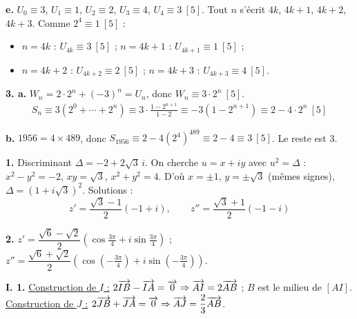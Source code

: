 \documentclass[11pt]{article}
\begin{document}
\textbf{e.} $U_0 \equiv 3$, $U_1 \equiv 1$, $U_2 \equiv 2$, $U_3 \equiv 4$, $U_4 \equiv 3\ [5]$. Tout $n$ s'écrit $4k$, $4k+1$, $4k+2$, $4k+3$. Comme $2^4 \equiv 1\ [5]$ :
\begin{itemize}
  \item $n = 4k$ : $U_{4k} \equiv 3\ [5]$ ; \quad $n = 4k+1$ : $U_{4k+1} \equiv 1\ [5]$ ;
  \item $n = 4k+2$ : $U_{4k+2} \equiv 2\ [5]$ ; \quad $n = 4k+3$ : $U_{4k+3} \equiv 4\ [5]$.
\end{itemize}

\textbf{3. a.} $W_n = 2\cdot 2^n + (-3)^n = U_n$, donc $W_n \equiv 3\cdot 2^n\ [5]$.
\begin{align*}
S_n \equiv 3(2^0 + \cdots + 2^n) \equiv 3\cdot\frac{1 - 2^{n+1}}{1 - 2} \equiv -3(1 - 2^{n+1}) \equiv 2 - 4\cdot 2^n\ [5]
\end{align*}

\textbf{b.} $1956 = 4\times489$, donc $S_{1956} \equiv 2 - 4(2^4)^{489} \equiv 2 - 4 \equiv 3\ [5]$. Le reste est 3.


\textbf{1.} Discriminant $\Delta = -2 + 2\sqrt{3}\,i$. On cherche $u = x + iy$ avec $u^2 = \Delta$ : $x^2 - y^2 = -2$, $xy = \sqrt{3}$, $x^2 + y^2 = 4$. D'où $x = \pm1$, $y = \pm\sqrt{3}$ (mêmes signes), $\Delta = (1 + i\sqrt{3})^2$. Solutions :
\[ z' = \frac{\sqrt{3} - 1}{2}(-1 + i), \qquad z'' = \frac{\sqrt{3} + 1}{2}(-1 - i) \]

\textbf{2.} $z' = \dfrac{\sqrt{6} - \sqrt{2}}{2}\left(\cos\tfrac{3\pi}{4} + i\sin\tfrac{3\pi}{4}\right)$ ; \quad $z'' = \dfrac{\sqrt{6} + \sqrt{2}}{2}\left(\cos\left(-\tfrac{3\pi}{4}\right) + i\sin\left(-\tfrac{3\pi}{4}\right)\right)$.

\prob{}

\textbf{I. 1.} \underline{Construction de $I$ :} $2\overrightarrow{IB} - \overrightarrow{IA} = \overrightarrow{0} \Rightarrow \overrightarrow{AI} = 2\overrightarrow{AB}$ ; $B$ est le milieu de $[AI]$. \underline{Construction de $J$ :} $2\overrightarrow{JB} + \overrightarrow{JA} = \overrightarrow{0} \Rightarrow \overrightarrow{AJ} = \dfrac{2}{3}\overrightarrow{AB}$.
\end{document}
